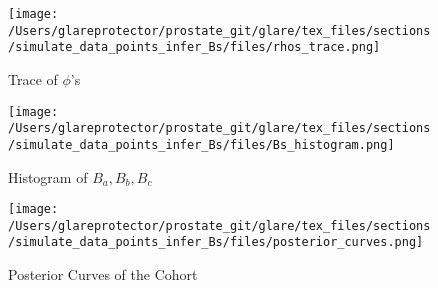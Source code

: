 \begin{figure}
\begin{center}
\texttt{[image: /Users/glareprotector/prostate\_git/glare/tex\_files/sections/simulate\_data\_points\_infer\_Bs/files/rhos\_trace.png]}
\caption{Trace of $\phi$'s}
\end{center}
\end{figure}

\begin{figure}
\begin{center}
\texttt{[image: /Users/glareprotector/prostate\_git/glare/tex\_files/sections/simulate\_data\_points\_infer\_Bs/files/Bs\_histogram.png]}
\caption{Histogram of $B_a, B_b, B_c$}
\end{center}
\end{figure}

\begin{figure}
\begin{center}
\texttt{[image: /Users/glareprotector/prostate\_git/glare/tex\_files/sections/simulate\_data\_points\_infer\_Bs/files/posterior\_curves.png]}
\caption{Posterior Curves of the Cohort}
\end{center}
\end{figure}